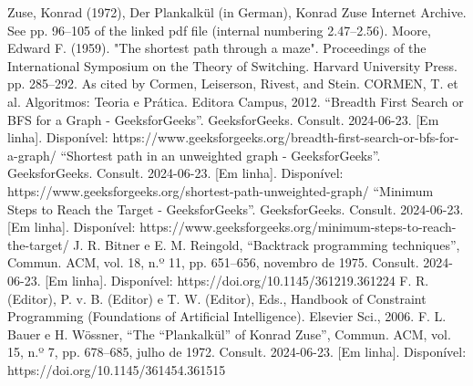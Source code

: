 \documentclass[relatorio]{IEEEtran}
\begin{document}
\renewcommand{\refname}{Referências}
\begin{thebibliography}{00}
 Zuse, Konrad (1972), Der Plankalkül (in German), Konrad Zuse Internet Archive. See pp. 96–105 of the linked pdf file (internal numbering 2.47–2.56).
 Moore, Edward F. (1959). "The shortest path through a maze". Proceedings of the International Symposium on the Theory of Switching. Harvard University Press. pp. 285–292. As cited by Cormen, Leiserson, Rivest, and Stein.
 CORMEN, T. et al. Algoritmos: Teoria e Prática. Editora Campus, 2012.
 “Breadth First Search or BFS for a Graph - GeeksforGeeks”. GeeksforGeeks. Consult. 2024-06-23. [Em linha]. Disponível: https://www.geeksforgeeks.org/breadth-first-search-or-bfs-for-a-graph/
 “Shortest path in an unweighted graph - GeeksforGeeks”. GeeksforGeeks. Consult. 2024-06-23. [Em linha]. Disponível: https://www.geeksforgeeks.org/shortest-path-unweighted-graph/
 “Minimum Steps to Reach the Target - GeeksforGeeks”. GeeksforGeeks. Consult. 2024-06-23. [Em linha]. Disponível: https://www.geeksforgeeks.org/minimum-steps-to-reach-the-target/
 J. R. Bitner e E. M. Reingold, “Backtrack programming techniques”, Commun. ACM, vol. 18, n.º 11, pp. 651–656, novembro de 1975. Consult. 2024-06-23. [Em linha]. Disponível: https://doi.org/10.1145/361219.361224
 F. R. (Editor), P. v. B. (Editor) e T. W. (Editor), Eds., Handbook of Constraint Programming (Foundations of Artificial Intelligence). Elsevier Sci., 2006.
 F. L. Bauer e H. Wössner, “The “Plankalkül” of Konrad Zuse”, Commun. ACM, vol. 15, n.º 7, pp. 678–685, julho de 1972. Consult. 2024-06-23. [Em linha]. Disponível: https://doi.org/10.1145/361454.361515
\end{thebibliography}
\end{document}
